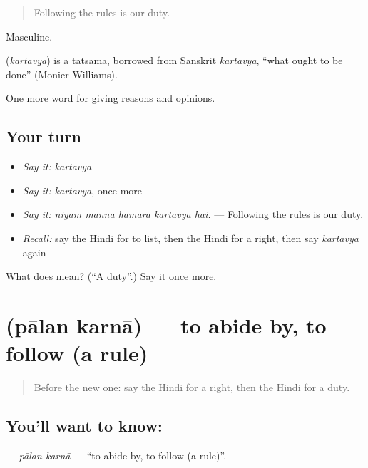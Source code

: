 \begin{quote}
Following the rules is our duty.
\end{quote}

Masculine.

\begin{cousinweb}
\textbf{} (\emph{kartavya}) is a tatsama, borrowed from Sanskrit \emph{kartavya}, \textquotedblleft{}what ought to be done\textquotedblright{} (Monier-Williams).
\end{cousinweb}

\begin{grammarlens}[title={What you've built}]
One more word for giving reasons and opinions.
\end{grammarlens}

\subsection*{Your turn}
\begin{itemize}
\raggedright
  \item \emph{Say it:} \emph{kartavya}
  \item \emph{Say it:} \emph{kartavya}, once more
  \item \emph{Say it:} \emph{niyam mānnā hamārā kartavya hai.} — Following the rules is our duty.
  \item \emph{Recall:} say the Hindi for to list, then the Hindi for a right, then say \emph{kartavya} again
\end{itemize}

\begin{tcolorbox}[breakable,colback=teal!4,colframe=teal!35!black,title={Before you move on}]
What does  mean? (\textquotedblleft{}A duty\textquotedblright{}.) Say it once more.
\end{tcolorbox}
\section[\texorpdfstring{\hi{पालन} \hi{करना} (pālan karnā)}{पालन करना (pālan karnā)}]{  (pālan karnā) — to abide by, to follow (a rule)}

\label{lesson:HI-C351-palankarna}



\begin{quote}
Before the new one: say the Hindi for a right, then the Hindi for a duty.
\end{quote}

\subsection*{You'll want to know:  }
\textbf{ } — \emph{pālan karnā} — \textquotedblleft{}to abide by, to follow (a rule)\textquotedblright{}.

